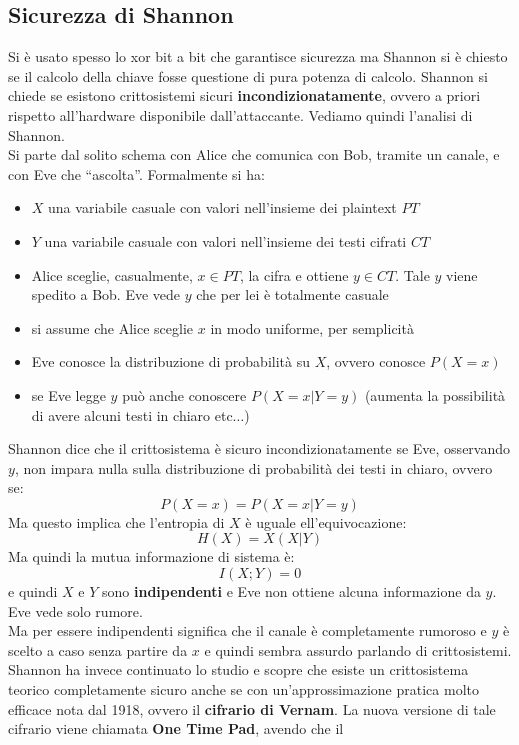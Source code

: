 \documentclass[a4paper,12pt, oneside]{book}
\begin{document}
\subsection{Sicurezza di Shannon}
Si è usato spesso lo xor bit a bit che garantisce sicurezza ma Shannon si è
chiesto se il calcolo della chiave fosse questione di pura potenza di calcolo.
Shannon si chiede se esistono crittosistemi sicuri \textbf{incondizionatamente},
ovvero a priori rispetto all'hardware disponibile dall'attaccante. Vediamo
quindi l'analisi di Shannon.\\
Si parte dal solito schema con Alice che comunica con Bob, tramite un canale, e
con Eve che ``ascolta''. Formalmente si ha:
\begin{itemize}
  \item $X$ una variabile casuale con valori nell'insieme dei plaintext $PT$
  \item $Y$ una variabile casuale con valori nell'insieme dei testi cifrati $CT$
  \item Alice sceglie, casualmente, $x\in PT$, la cifra e ottiene $y\in
  CT$. Tale $y$ viene spedito a Bob. Eve vede $y$ che per lei è totalmente
  casuale
  \item si assume che Alice sceglie $x$ in modo uniforme, per semplicità
  \item Eve conosce la distribuzione di probabilità su $X$, ovvero conosce
  $P(X=x)$ 
  \item se Eve legge $y$ può anche conoscere $P(X=x|Y=y)$ (aumenta la
  possibilità di avere alcuni testi in chiaro etc$\ldots$)
\end{itemize}
Shannon dice che il crittosistema è sicuro incondizionatamente se Eve,
osservando $y$, non impara nulla sulla distribuzione di probabilità dei testi in
chiaro, ovvero se:
\[P(X=x)=P(X=x|Y=y)\]
Ma questo implica che l'entropia di $X$ è uguale ell'equivocazione:
\[H(X)=X(X|Y)\]
Ma quindi la mutua informazione di sistema è:
\[I(X;Y)=0\]
e quindi $X$ e $Y$ sono \textbf{indipendenti} e Eve non ottiene alcuna
informazione da $y$. Eve vede solo rumore.\\
Ma per essere indipendenti significa che il canale è completamente rumoroso e
$y$ è scelto a caso senza partire da $x$ e quindi sembra assurdo parlando di
crittosistemi. \\
Shannon ha invece continuato lo studio e scopre che esiste un crittosistema
teorico completamente sicuro anche se con un'approssimazione pratica molto
efficace nota dal 1918, ovvero il \textbf{cifrario di Vernam}. La nuova versione
di tale cifrario viene chiamata \textbf{One Time Pad}, avendo che il
\end{document}
